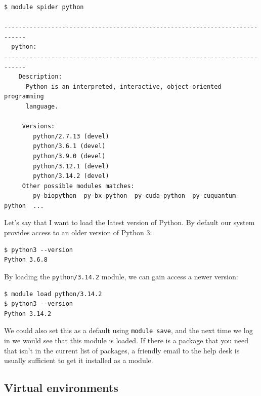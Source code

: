 \begin{lstlisting}[style=shell]
$ module spider python

----------------------------------------------------------------------------
  python:
----------------------------------------------------------------------------
    Description:
      Python is an interpreted, interactive, object-oriented programming
      language.

     Versions:
        python/2.7.13 (devel)
        python/3.6.1 (devel)
        python/3.9.0 (devel)
        python/3.12.1 (devel)
        python/3.14.2 (devel)
     Other possible modules matches:
        py-biopython  py-bx-python  py-cuda-python  py-cuquantum-python  ...
\end{lstlisting}

Let's say that I want to load the latest version of Python.  By default our system provides access to an older version of Python 3:

\begin{lstlisting}[style=shellshort]
$ python3 --version
Python 3.6.8
\end{lstlisting}

By loading the \texttt{python/3.14.2} module, we can gain access a newer version:

\begin{lstlisting}[style=shellshort]
$ module load python/3.14.2
$ python3 --version
Python 3.14.2
\end{lstlisting}

We could also set this as a default using \texttt{module save}, and the next time we log in we would see that this module is loaded.  If there is a package that you need that isn't in the current list of packages, a friendly email to the help desk is usually sufficient to get it installed as a module.

\subsection{Virtual environments}

